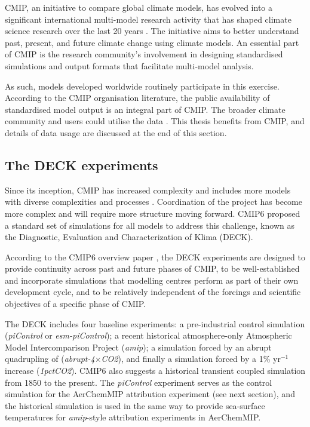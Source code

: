 CMIP, an initiative to compare global climate models, has evolved into a significant international multi-model research activity that has shaped climate science research over the last 20 years \citep{eyringOverviewCoupledModel2016}. The initiative aims to better understand past, present, and future climate change using climate models. An essential part of CMIP is the research community's involvement in designing standardised simulations and output formats that facilitate multi-model analysis. 

As such, models developed worldwide routinely participate in this exercise. According to the CMIP organisation literature, the public availability of standardised model output is an integral part of CMIP. The broader climate community and users could utilise the data \citep{eyringOverviewCoupledModel2016}. This thesis benefits from CMIP, and details of data usage are discussed at the end of this section.

\subsection{The DECK experiments}

Since its inception, CMIP has increased complexity and includes more models with diverse complexities and processes \citep{eyringOverviewCoupledModel2016}. Coordination of the project has become more complex and will require more structure moving forward. CMIP6 proposed a standard set of simulations for all models to address this challenge, known as the Diagnostic, Evaluation and Characterization of Klima (DECK). 

According to the CMIP6 overview paper \citep{eyringOverviewCoupledModel2016}, the DECK experiments are designed to provide continuity across past and future phases of CMIP, to be well-established and incorporate simulations that modelling centres perform as part of their own development cycle, and to be relatively independent of the forcings and scientific objectives of a specific phase of CMIP. 

The DECK includes four baseline experiments: a pre-industrial control simulation (\textit{piControl} or \textit{esm-piControl}); a recent historical atmosphere-only Atmospheric Model Intercomparison Project (\textit{amip}); a simulation forced by an abrupt quadrupling of  (\textit{abrupt-4$\times$CO2}), and finally a simulation forced by a 1\% yr$^{-1}$  increase (\textit{1pctCO2}). CMIP6 also suggests a historical transient coupled simulation from 1850 to the present.  The \textit{piControl} experiment serves as the control simulation for the AerChemMIP attribution experiment (see next section), and the historical simulation is used in the same way to provide sea-surface temperatures for \textit{amip}-style attribution experiments in AerChemMIP.

